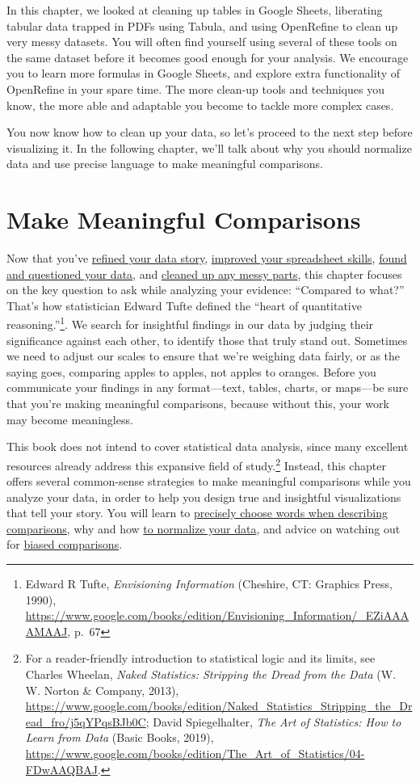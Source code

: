 \documentclass[
  english,
]{book}
\begin{document}
In this chapter, we looked at cleaning up tables in Google Sheets,
liberating tabular data trapped in PDFs using Tabula, and using
OpenRefine to clean up very messy datasets.
You will often find yourself using several of these tools on the same dataset
before it becomes good enough for your analysis. We encourage you to
learn more formulas in Google Sheets, and explore extra functionality of OpenRefine
in your spare time. The more clean-up tools and techniques you know, the more able and adaptable
you become to tackle more complex cases.

You now know how to clean up your data, so let's proceed to the next step before visualizing it.
In the following chapter, we'll talk about why you should normalize data and use precise language to make meaningful comparisons.

\hypertarget{comparisons}{%
\chapter{Make Meaningful Comparisons}\label{comparisons}}

Now that you've \href{choose.html}{refined your data story}, \href{spreadsheet.html}{improved your spreadsheet skills}, \href{find.html}{found and questioned your data}, and \href{clean.html}{cleaned up any messy parts}, this chapter focuses on the key question to ask while analyzing your evidence: ``Compared to what?'' That's how statistician Edward Tufte defined the ``heart of quantitative reasoning.''\footnote{Edward R Tufte, \emph{Envisioning {Information}} ({Cheshire, CT}: {Graphics Press}, 1990), \url{https://www.google.com/books/edition/Envisioning_Information/_EZiAAAAMAAJ}, p.~67}. We search for insightful findings in our data by judging their significance against each other, to identify those that truly stand out. Sometimes we need to adjust our scales to ensure that we're weighing data fairly, or as the saying goes, comparing apples to apples, not apples to oranges. Before you communicate your findings in any format---text, tables, charts, or maps---be sure that you're making meaningful comparisons, because without this, your work may become meaningless.

This book does not intend to cover statistical data analysis, since many excellent resources already address this expansive field of study.\footnote{For a reader-friendly introduction to statistical logic and its limits, see Charles Wheelan, \emph{Naked {Statistics}: {Stripping} the {Dread} from the {Data}} ({W. W. Norton \& Company}, 2013), \url{https://www.google.com/books/edition/Naked_Statistics_Stripping_the_Dread_fro/j5qYPqsBJb0C}; David Spiegelhalter, \emph{The {Art} of {Statistics}: {How} to {Learn} from {Data}} ({Basic Books}, 2019), \url{https://www.google.com/books/edition/The_Art_of_Statistics/04-FDwAAQBAJ}.} Instead, this chapter offers several common-sense strategies to make meaningful comparisons while you analyze your data, in order to help you design true and insightful visualizations that tell your story. You will learn to \href{describe-comparisons.html}{precisely choose words when describing comparisons}, why and how \href{normalize.html}{to normalize your data}, and advice on watching out for \href{biased-comparisons.html}{biased comparisons}.
\end{document}
